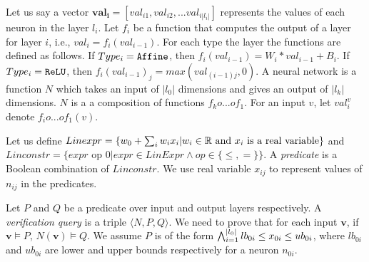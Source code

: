 

Let us say a vector $\boldsymbol{val_i} = [val_{i1}, val_{i2}, ... val_{i|l_i|}]$ represents the values
of each neuron 
in the layer $l_i$.
Let $f_i$ be a function that computes the output of a layer for layer $i$,
i.e., $val_i = f_i(val_{i-1})$.
For each type the layer the functions are defined as follows.
If $Type_i = \mathtt{Affine}$, then $f_{i}(val_{i-1}) = W_i * val_{i-1} + B_i$.
If $Type_i = \mathtt{ReLU}$, then $f_{i}(val_{i-1})_j =  max(val_{{(i-1)}j},0)$.
%
A neural network is a function $N$ which takes an input of $|l_0|$ dimensions and gives an 
output of $|l_k|$ dimensions. $N$ is a a composition of functions $f_k o ... o f_1$.
For an input $v$, let $val^v_{i}$ denote $f_i o ... o f_1(v)$.

Let us define 
$Linexpr = \{ w_0 + \sum_{i} w_i x_i | w_i \in \mathbb{R} \text{ and } x_i \text{ is a real variable} \}$
and
$Linconstr = \{expr \text{ op } 0 | expr \in LinExpr \land op \in \{\leq, = \}\}$.
A {\em predicate} is a Boolean combination of $Linconstr$.
We use real variable $x_{ij}$ to represent values of $n_{ij}$ in the predicates.

Let $P$ and $Q$ be a predicate over input and output layers respectively.
A {\em verification query} is a triple $\langle N, P, Q \rangle$.
We need to prove that for each input $\boldsymbol{v}$,
if $\boldsymbol{v} \models P$, $N(\boldsymbol{v}) \models Q$.
We assume $P$ is of the form
$\bigwedge_{i=1}^{|l_0|}lb_{0i} \leq x_{0i} \leq ub_{0i}$, where $lb_{0i}$ and $ub_{0i}$ are lower and upper bounds respectively for a neuron $n_{0i}$.






